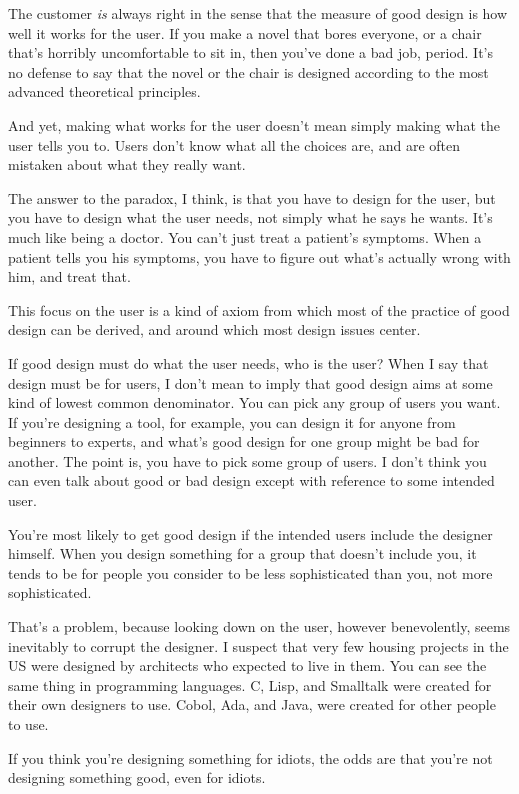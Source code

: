The customer \emph{is} always right in the sense that the measure of
good design is how well it works for the user. If you make a novel that
bores everyone, or a chair that's horribly uncomfortable to sit in, then
you've done a bad job, period. It's no defense to say that the novel or
the chair is designed according to the most advanced theoretical
principles.

And yet, making what works for the user doesn't mean simply making what
the user tells you to. Users don't know what all the choices are, and
are often mistaken about what they really want.

The answer to the paradox, I think, is that you have to design for the
user, but you have to design what the user needs, not simply what he
says he wants. It's much like being a doctor. You can't just treat a
patient's symptoms. When a patient tells you his symptoms, you have to
figure out what's actually wrong with him, and treat that.

This focus on the user is a kind of axiom from which most of the
practice of good design can be derived, and around which most design
issues center.

If good design must do what the user needs, who is the user? When I say
that design must be for users, I don't mean to imply that good design
aims at some kind of lowest common denominator. You can pick any group
of users you want. If you're designing a tool, for example, you can
design it for anyone from beginners to experts, and what's good design
for one group might be bad for another. The point is, you have to pick
some group of users. I don't think you can even talk about good or bad
design except with reference to some intended user.

You're most likely to get good design if the intended users include the
designer himself. When you design something for a group that doesn't
include you, it tends to be for people you consider to be less
sophisticated than you, not more sophisticated.

That's a problem, because looking down on the user, however
benevolently, seems inevitably to corrupt the designer. I suspect that
very few housing projects in the US were designed by architects who
expected to live in them. You can see the same thing in programming
languages. C, Lisp, and Smalltalk were created for their own designers
to use. Cobol, Ada, and Java, were created for other people to use.

If you think you're designing something for idiots, the odds are that
you're not designing something good, even for idiots.

